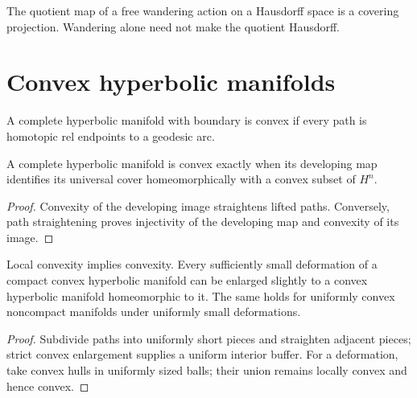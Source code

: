 \begin{proposition}
\label{thurston-ch08-wandering-covering}
The quotient map of a free wandering action on a Hausdorff space is a covering projection.  Wandering alone need not make the quotient Hausdorff.
\end{proposition}

\section{Convex hyperbolic manifolds}

\begin{definition}
\label{thurston-ch08-convex-manifold}
A complete hyperbolic manifold with boundary is convex if every path is homotopic rel endpoints to a geodesic arc.
\end{definition}

\begin{proposition}
\label{thurston-ch08-convex-developing}
A complete hyperbolic manifold is convex exactly when its developing map identifies its universal cover homeomorphically with a convex subset of $H^n$.
\end{proposition}
\begin{proof}\sketch Convexity of the developing image straightens lifted paths.  Conversely, path straightening proves injectivity of the developing map and convexity of its image.\end{proof}

\begin{proposition}
\label{thurston-ch08-convex-deformation}
Local convexity implies convexity.  Every sufficiently small deformation of a compact convex hyperbolic manifold can be enlarged slightly to a convex hyperbolic manifold homeomorphic to it.  The same holds for uniformly convex noncompact manifolds under uniformly small deformations.
\end{proposition}
\begin{proof}\sketch Subdivide paths into uniformly short pieces and straighten adjacent pieces; strict convex enlargement supplies a uniform interior buffer.  For a deformation, take convex hulls in uniformly sized balls; their union remains locally convex and hence convex.\end{proof}

